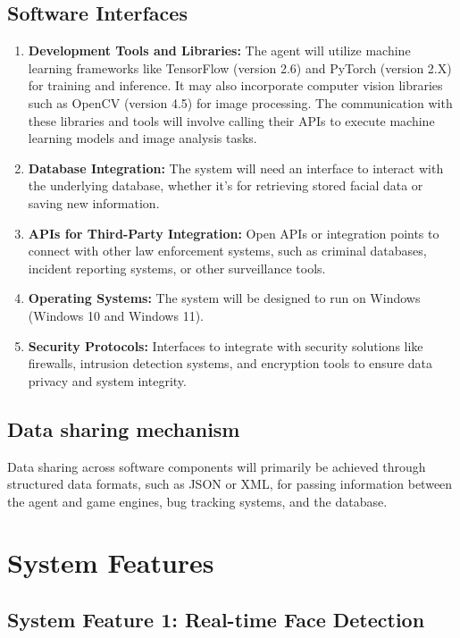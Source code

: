     \subsection{Software Interfaces}
            \begin{enumerate}
                \item \textbf{Development Tools and Libraries:} The agent will utilize machine learning frameworks like TensorFlow (version 2.6) and PyTorch (version 2.X) for training and inference. It may also incorporate computer vision libraries such as OpenCV (version 4.5) for image processing. The communication with these libraries and tools will involve calling their APIs to execute machine learning models and image analysis tasks.
                \item \textbf{Database Integration:} The system will need an interface to interact with the underlying database, whether it's for retrieving stored facial data or saving new information.
                \item \textbf{APIs for Third-Party Integration:} Open APIs or integration points to connect with other law enforcement systems, such as criminal databases, incident reporting systems, or other surveillance tools.
                \item \textbf{Operating Systems:} The system will be designed to run on  Windows (Windows 10 and Windows 11).
                \item \textbf{Security Protocols:} Interfaces to integrate with security solutions like firewalls, intrusion detection systems, and encryption tools to ensure data privacy and system integrity.
            \end{enumerate}
    \subsection{Data sharing mechanism}
        Data sharing across software components will primarily be achieved through structured data formats, such as JSON or XML, for passing information between the agent and game engines, bug tracking systems, and the database.


\section{System Features}  
    \subsection{System Feature 1: Real-time Face Detection}   
